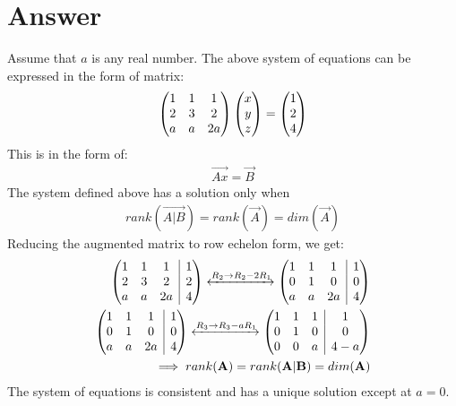 \documentclass[journal,12pt,twocolumn]{IEEEtran}
\begin{document}
\section{Answer}
Assume that $a$ is any real number. The above system of equations can be expressed in the form of matrix:
\begin{align}
\begin{pmatrix}1 & 1 & 1\\2 & 3 & 2\\a & a & 2a\end{pmatrix} \begin{pmatrix}x\\y\\z\end{pmatrix} = \begin{pmatrix}1\\2\\4\end{pmatrix}
\end{align}
This is in the form of:
\begin{align}
\label{eqn_aug}
\vec{Ax}=\vec{B}
\end{align}
The system defined above has a solution only when
\begin{align*}
rank(\vec{A|B}) = rank(\vec{A}) = dim(\vec{A})
\end{align*}
Reducing the augmented matrix to row echelon form, we get:
\begin{align}
\myvec{1 & 1 & 1 & \BAR & 1 \\2 & 3 & 2 & \BAR & 2 \\a & a & 2a & \BAR & 4}
\xleftrightarrow[]{R_2\rightarrow R_2-2R_1}
\myvec{1 & 1 & 1 & \BAR & 1 \\0 & 1 & 0 & \BAR & 0 \\a & a & 2a & \BAR & 4}
\\ \myvec{1 & 1 & 1 & \BAR & 1 \\0 & 1 & 0 & \BAR & 0 \\a & a & 2a & \BAR & 4}\xleftrightarrow[]{R_3\rightarrow R_3-aR_1}
\myvec{1 & 1 & 1 & \BAR & 1 \\0 & 1 & 0 & \BAR & 0 \\0 & 0 & a & \BAR & 4-a}
\\ \implies rank(\vec{A}) = rank(\vec{A|B}) = dim(\vec{A})
\end{align}
The system of equations is consistent and has a unique solution except at $a = 0$.
\end{document}
